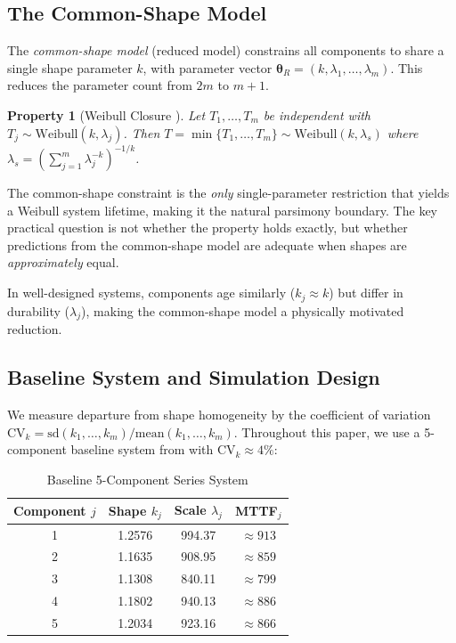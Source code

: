 \documentclass[11pt]{article}
\renewcommand{\v}[1]{\boldsymbol{#1}}
\newtheorem{property}{Property}[section]
\begin{document}
\subsection{The Common-Shape Model}

The \emph{common-shape model} (reduced model) constrains all components to share a single shape parameter $k$, with parameter vector $\v\theta_R = (k, \lambda_1, \ldots, \lambda_m)$. This reduces the parameter count from $2m$ to $m+1$.

\begin{property}[Weibull Closure {\citealt{barlow1975}}]
\label{prop:weibull-closure}
Let $T_1, \ldots, T_m$ be independent with $T_j \sim \text{Weibull}(k, \lambda_j)$. Then $T = \min\{T_1, \ldots, T_m\} \sim \text{Weibull}(k, \lambda_s)$ where $\lambda_s = (\sum_{j=1}^{m} \lambda_j^{-k})^{-1/k}$.
\end{property}

The common-shape constraint is the \emph{only} single-parameter restriction that yields a Weibull system lifetime, making it the natural parsimony boundary. The key practical question is not whether the property holds exactly, but whether predictions from the common-shape model are adequate when shapes are \emph{approximately} equal.

In well-designed systems, components age similarly ($k_j \approx k$) but differ in durability ($\lambda_j$), making the common-shape model a physically motivated reduction.

\subsection{Baseline System and Simulation Design}
\label{sec:baseline}

We measure departure from shape homogeneity by the coefficient of variation $\text{CV}_k = \text{sd}(k_1,\ldots,k_m)/\text{mean}(k_1,\ldots,k_m)$. Throughout this paper, we use a 5-component baseline system from \citep{Huairu-2013} with $\text{CV}_k \approx 4\%$:

\begin{table}[htbp]
\centering
\caption{Baseline 5-Component Series System}
\label{tab:series-sys}
\begin{tabular}{cccc}
\hline
Component $j$ & Shape $k_j$ & Scale $\lambda_j$ & MTTF$_j$ \\
\hline
1 & 1.2576 & 994.37 & $\approx 913$ \\
2 & 1.1635 & 908.95 & $\approx 859$ \\
3 & 1.1308 & 840.11 & $\approx 799$ \\
4 & 1.1802 & 940.13 & $\approx 886$ \\
5 & 1.2034 & 923.16 & $\approx 866$ \\
\hline
\end{tabular}
\end{table}
\end{document}
